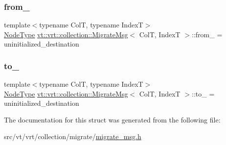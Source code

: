 \mbox{\label{structvt_1_1vrt_1_1collection_1_1_migrate_msg_a1b6255e6321bcac5244caf9f01c1fb47}} 
\subsubsection{\texorpdfstring{from\+\_\+}{from\_}}
{\footnotesize\ttfamily template$<$typename ColT, typename IndexT$>$ \\
\hyperlink{namespacevt_a866da9d0efc19c0a1ce79e9e492f47e2}{Node\+Type} \hyperlink{structvt_1_1vrt_1_1collection_1_1_migrate_msg}{vt\+::vrt\+::collection\+::\+Migrate\+Msg}$<$ ColT, IndexT $>$\+::from\+\_\+ = uninitialized\+\_\+destination\hspace{0.3cm}{\ttfamily [private]}}

\mbox{\label{structvt_1_1vrt_1_1collection_1_1_migrate_msg_a8bb8dc33230f27eef17bc2beb07ab32a}} 
\subsubsection{\texorpdfstring{to\+\_\+}{to\_}}
{\footnotesize\ttfamily template$<$typename ColT, typename IndexT$>$ \\
\hyperlink{namespacevt_a866da9d0efc19c0a1ce79e9e492f47e2}{Node\+Type} \hyperlink{structvt_1_1vrt_1_1collection_1_1_migrate_msg}{vt\+::vrt\+::collection\+::\+Migrate\+Msg}$<$ ColT, IndexT $>$\+::to\+\_\+ = uninitialized\+\_\+destination\hspace{0.3cm}{\ttfamily [private]}}



The documentation for this struct was generated from the following file\+:\begin{DoxyCompactItemize}
\item 
src/vt/vrt/collection/migrate/\hyperlink{migrate__msg_8h}{migrate\+\_\+msg.\+h}\end{DoxyCompactItemize}
